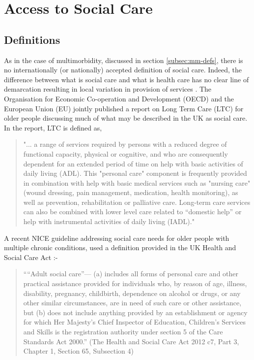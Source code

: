 \documentclass[12pt,]{report}
\begin{document}
\section{Access to Social Care}\label{sec:access-sc}

\subsection{Definitions}\label{subsec:access-sc-defs}

As in the case of multimorbidity, discussed in section
\ref{subsec:mm-defs}, there is no internationally (or nationally)
accepted definition of social care. Indeed, the difference between what
is social care and what is health care has no clear line of demarcation
resulting in local variation in provision of services \citep{RN371}. The
Organisation for Economic Co-operation and Development (OECD) and the
European Union (EU) jointly published a report on Long Term Care (LTC)
for older people discussing much of what may be described in the UK as
social care. In the report, LTC is defined as,

\begin{quotation}
"... a range of services required by persons with a reduced degree of functional capacity, physical or cognitive, and who are consequently dependent for an extended period of time on help with basic activities of daily living (ADL). This "personal care" component is frequently provided in combination with help with basic medical services such as "nursing care" (wound dressing, pain management, medication, health monitoring), as well as prevention, rehabilitation or palliative care. Long-term care services can also be combined with lower level care related to “domestic help” or help with instrumental activities of daily living (IADL)." 
\end{quotation}

\citep[pp38]{RN406}

A recent NICE guideline \citeyearpar{RN150} addressing social care needs
for older people with multiple chronic conditions, used a definition
provided in the UK Health and Social Care Act \citeyearpar{RN149}:-

\begin{quotation}
    ““Adult social care”—
    (a) includes all forms of personal care and other practical assistance provided for individuals who, by reason of age, illness, disability, pregnancy, childbirth, dependence on alcohol or drugs, or any other similar circumstances, are in need of such care or other assistance, but 
    (b) does not include anything provided by an establishment or agency for which Her Majesty’s Chief Inspector of Education, Children’s Services and Skills is the registration authority under section 5 of the Care Standards Act 2000.”
    (The Health and Social Care Act  2012 c7, Part 3, Chapter 1, Section 65, Subsection 4)
\end{quotation}
\end{document}
